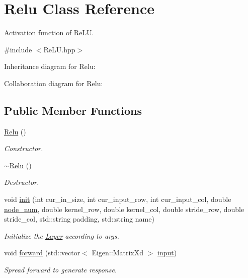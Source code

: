 \hypertarget{class_relu}{}\section{Relu Class Reference}
\label{class_relu}


Activation function of Re\+LU.  




{\ttfamily \#include $<$Re\+L\+U.\+hpp$>$}



Inheritance diagram for Relu\+:


Collaboration diagram for Relu\+:
\subsection*{Public Member Functions}
\begin{DoxyCompactItemize}
\item 
\hyperlink{class_relu_ade6da5fa61d942a8f50d661dc997a985}{Relu} ()
\begin{DoxyCompactList}\small\item\em Constructor. \end{DoxyCompactList}\item 
\hyperlink{class_relu_a5be6c8bbdae0dd17597cfeaad4eee717}{$\sim$\+Relu} ()
\begin{DoxyCompactList}\small\item\em Destructor. \end{DoxyCompactList}\item 
void \hyperlink{class_relu_a3efe8891f86dea80500302d7cd9fe605}{init} (int cur\+\_\+in\+\_\+size, int cur\+\_\+input\+\_\+row, int cur\+\_\+input\+\_\+col, double \hyperlink{class_layer_a2f19878482d098654fb084b9c21b72ed}{node\+\_\+num}, double kernel\+\_\+row, double kernel\+\_\+col, double stride\+\_\+row, double stride\+\_\+col, std\+::string padding, std\+::string name)
\begin{DoxyCompactList}\small\item\em Initialize the \hyperlink{class_layer}{Layer} according to args. \end{DoxyCompactList}\item 
void \hyperlink{class_relu_affdc902d266350bc024e31836fa2395b}{forward} (std\+::vector$<$ Eigen\+::\+Matrix\+Xd $>$ \hyperlink{class_layer_a5213366d9a5a7317c5d40d9efdcfa623}{input})
\begin{DoxyCompactList}\small\item\em Spread forward to generate response. \end{DoxyCompactList}\end{DoxyCompactItemize}
